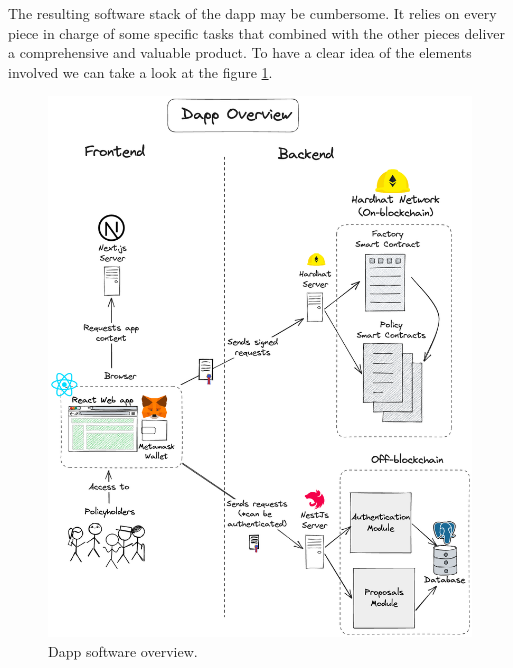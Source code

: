 {
The resulting software stack of the dapp may be cumbersome. It relies on every piece in charge of some specific tasks that combined with the other pieces deliver a comprehensive and valuable product. To have a clear idea of the elements involved we can take a look at the figure \ref{fig:dapp-overview}.

\begin{figure}[H]
\centering
\includegraphics[width=14cm]{img/results/dapp-overview.png}
\caption[Dapp software overview]{\footnotesize{Dapp software overview.}}
\label{fig:dapp-overview}
\end{figure}

}
